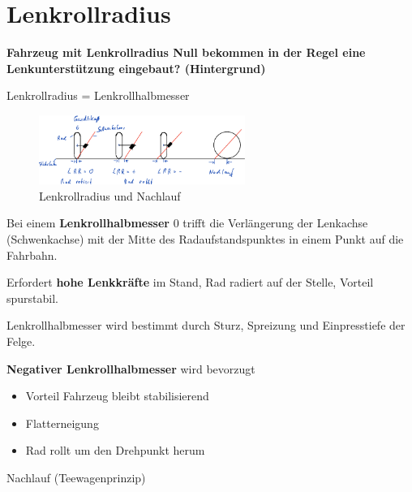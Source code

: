 \section{Lenkrollradius}\label{lenkrollradius}

\textbf{Fahrzeug mit Lenkrollradius Null bekommen in der Regel eine
Lenkunterstützung eingebaut? (Hintergrund)}

Lenkrollradius = Lenkrollhalbmesser

\begin{figure}[!ht]%
\centering
\includegraphics[width=0.6\textwidth]{images/Skizze/27_FT_Lenkrollradius_Nachlauf.pdf}
\caption{Lenkrollradius und Nachlauf}
\end{figure}

Bei einem \textbf{Lenkrollhalbmesser} $0$ trifft die Verlängerung der
Lenkachse (Schwenkachse) mit der Mitte des Radaufstandspunktes in einem
Punkt auf die Fahrbahn.

Erfordert \textbf{hohe Lenkkräfte} im Stand, Rad radiert auf der Stelle,
Vorteil spurstabil.

Lenkrollhalbmesser wird bestimmt durch Sturz, Spreizung und
Einpresstiefe der Felge.

\textbf{Negativer Lenkrollhalbmesser} wird bevorzugt

\begin{itemize}
\item
  Vorteil Fahrzeug bleibt stabilisierend
\item
  Flatterneigung
\item
  Rad rollt um den Drehpunkt herum
\end{itemize}

Nachlauf (Teewagenprinzip)
